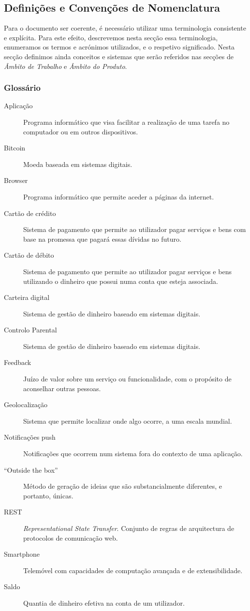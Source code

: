 \documentclass[12pt,a4paper]{article}
\begin{document}
  \subsection{Definições e Convenções de Nomenclatura}

    Para o documento ser coerente, é necessário utilizar uma terminologia consistente e explícita. Para este efeito, descrevemos nesta secção essa terminologia, enumeramos os termos e acrónimos utilizados, e o respetivo significado. Nesta secção definimos ainda conceitos e sistemas que serão referidos nas secções de \emph{Âmbito de Trabalho} e \emph{Âmbito do Produto}.

    \subsubsection{Glossário}

      \begin{description}
        \item[Aplicação]Programa informático que visa facilitar a realização de uma tarefa no computador ou em outros dispositivos.
        \item[Bitcoin]Moeda baseada em sistemas digitais.
        \item[Browser]Programa informático que permite aceder a páginas da internet.
        \item[Cartão de crédito]Sistema de pagamento que permite ao utilizador pagar serviços e bens com base na promessa que pagará essas dívidas no futuro.

        \item[Cartão de débito]Sistema de pagamento que permite ao utilizador pagar serviços e bens utilizando o dinheiro que possui numa conta que esteja associada.
        \item[Carteira digital]Sistema de gestão de dinheiro baseado em sistemas digitais.
        \item[Controlo Parental]Sistema de gestão de dinheiro baseado em sistemas digitais.
        \item[Feedback]Juízo de valor sobre um serviço ou funcionalidade, com o propósito de aconselhar outras pessoas.
        \item[Geolocalização]Sistema que permite localizar onde algo ocorre, a uma escala mundial.

        \item[Notificações push]Notificações que ocorrem num sistema fora do contexto de uma aplicação.
        \item[``Outside the box'']Método de geração de ideias que são substancialmente diferentes, e portanto, únicas.
        \item[REST]\emph{Representational State Transfer}. Conjunto de regras de arquitectura de protocolos de comunicação web.
        \item[Smartphone]Telemóvel com capacidades de computação avançada e de extensibilidade.
        \item[Saldo]Quantia de dinheiro efetiva na conta de um utilizador.
      \end{description}
\end{document}
